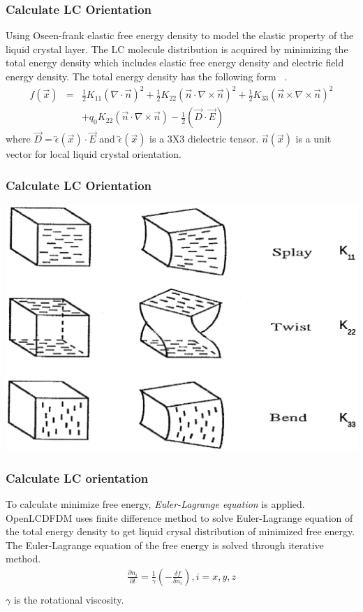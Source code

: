 \documentclass{beamer}
\begin{document}
\begin{frame}
\frametitle{Calculate LC Orientation}
Using Oseen-frank elastic free energy density to model the elastic property of the liquid crystal layer.
The LC molecule distribution is acquired by minimizing the total energy density which includes elastic free energy density and electric field energy density.
The total energy density has the following form ~\cite{ShinTson}.
\begin{eqnarray}
f(\vec x) &=& \frac{1}{2}K_{11}(\nabla\cdot\vec n)^2+\frac{1}{2}K_{22}(\vec n\cdot\nabla\times\vec n)^2 + \frac{1}{2}K_{33}(\vec n\times\nabla\times\vec n)^2\nonumber \\
&&+q_0K_{22}(\vec n\cdot\nabla\times\vec n) - \frac{1}{2}(\vec D\cdot\vec E)\nonumber
\label{eq:free_energy}
\end{eqnarray}
where $\vec D = \overleftrightarrow{\epsilon}(\vec x)\cdot \vec E$ and $\overleftrightarrow{\epsilon}(\vec x)$ is a 3X3 dielectric tensor. $\vec n(\vec{x})$ is a unit vector for local liquid crystal orientation.
\end{frame}
\begin{frame}
\frametitle{Calculate LC Orientation}
\begin{center}
\includegraphics[scale=0.3]{lc_k_const.eps}
\end{center}
\end{frame}
\begin{frame}
\frametitle{Calculate LC orientation}
To calculate minimize free energy, \emph{Euler-Lagrange equation} is applied. OpenLCDFDM uses finite difference method to solve Euler-Lagrange equation of the total energy density to get liquid crysal distribution of minimized free energy.\\
The Euler-Lagrange equation of the free energy is solved through iterative method.
\begin{eqnarray}
\frac{\partial n_i}{\partial t} = \frac{1}{\gamma} \left( -\frac{\delta f}{\delta n_i} \right), i = x, y, z \\ \nonumber
\end{eqnarray}
$\gamma$ is the rotational viscosity.
\end{frame}
\end{document}
